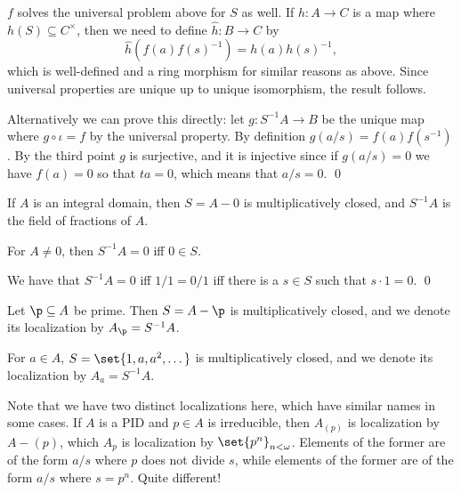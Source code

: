 \ecoro

\bproof

    $f$ solves the universal problem above for $S$ as well.
    If $h\colon A\to C$ is a map where $h(S)\subseteq C^\times$, then we need to define $\hat h\colon B\to C$ by
    $$ \hat h(f(a)f(s)^{-1}) = h(a)h(s)^{-1} , $$
    which is well-defined and a ring morphism for similar reasons as above.
    Since universal properties are unique up to unique isomorphism, the result follows.

    Alternatively we can prove this directly: let $g\colon S^{-1}A\to B$ be the unique map where $g\circ\iota=f$ by the universal property.
    By definition $g(a/s)=f(a)f(s^{-1})$.
    By the third point $g$ is surjective, and it is injective since if $g(a/s)=0$ we have $f(a)=0$ so that $ta=0$, which means that $a/s=0$.
    \qed

\eproof

\bexam

    If $A$ is an integral domain, then $S=A-0$ is multiplicatively closed, and $S^{-1}A$ is the field of fractions of $A$.

\eexam

\bprop

    For $A\neq0$, then $S^{-1}A=0$ iff $0\in S$.

\eprop

\bproof

    We have that $S^{-1}A=0$ iff $1/1=0/1$ iff there is a $s\in S$ such that $s\cdot1=0$.
    \qed

\eproof

\bdefn

    Let $\p\subseteq A$ be prime.
    Then $S=A-\p$ is multiplicatively closed, and we denote its localization by $A_\p=S^{-1}A$.

    For $a\in A$, $S=\set{1,a,a^2,\dots}$ is multiplicatively closed, and we denote its localization by $A_a=S^{-1}A$.

\edefn

\bnote

    Note that we have two distinct localizations here, which have similar names in some cases.
    If $A$ is a PID and $p\in A$ is irreducible, then $A_{(p)}$ is localization by $A-(p)$, which $A_p$ is localization by $\set{p^n}_{n<\omega}$.
    Elements of the former are of the form $a/s$ where $p$ does not divide $s$, while elements of the former are of the form $a/s$ where $s=p^n$.
    Quite different!

\enote

